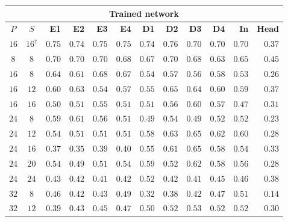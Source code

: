 \begin{table}[!tbp]
    \centering
    \color{red}\captionsetup{font+=probingred} %
    \small
    \setlength{\tabcolsep}{3.5pt}
    \begin{tabular}{@{}ccrrrrrrrrrr@{}}
        \toprule
        \multicolumn{12}{c}{\textbf{Trained network}} \\
        \midrule
        \textbf{$P$} & \textbf{$S$} & \textbf{E1} & \textbf{E2} & \textbf{E3} & \textbf{E4} & \textbf{D1} & \textbf{D2} & \textbf{D3} & \textbf{D4} & \textbf{In} & \textbf{Head} \\
        \midrule
        $16$ & $16^{\dagger}$ & $0.75$ & $0.74$ & $0.75$ & $0.75$ & $0.74$ & $0.76$ & $0.70$ & $0.70$ & $0.70$ & $0.37$ \\
        \midrule
        \addlinespace[2pt]
        $8$ & $8$ & $0.70$ & $0.70$ & $0.70$ & $0.68$ & $0.67$ & $0.70$ & $0.68$ & $0.63$ & $0.65$ & $0.45$ \\
        \addlinespace[2pt]
        $16$ & $8$ & $0.64$ & $0.61$ & $0.68$ & $0.67$ & $0.54$ & $0.57$ & $0.56$ & $0.58$ & $0.53$ & $0.26$ \\
        $16$ & $12$ & $0.60$ & $0.63$ & $0.54$ & $0.57$ & $0.55$ & $0.65$ & $0.64$ & $0.60$ & $0.59$ & $0.37$ \\
        $16$ & $16$ & $0.50$ & $0.51$ & $0.55$ & $0.51$ & $0.51$ & $0.56$ & $0.60$ & $0.57$ & $0.47$ & $0.31$ \\
        \addlinespace[2pt]
        $24$ & $8$ & $0.59$ & $0.61$ & $0.56$ & $0.51$ & $0.49$ & $0.54$ & $0.49$ & $0.52$ & $0.52$ & $0.23$ \\
        $24$ & $12$ & $0.54$ & $0.51$ & $0.51$ & $0.51$ & $0.58$ & $0.63$ & $0.65$ & $0.62$ & $0.60$ & $0.28$ \\
        $24$ & $16$ & $0.37$ & $0.35$ & $0.39$ & $0.40$ & $0.55$ & $0.61$ & $0.65$ & $0.58$ & $0.54$ & $0.33$ \\
        $24$ & $20$ & $0.54$ & $0.49$ & $0.51$ & $0.54$ & $0.59$ & $0.52$ & $0.62$ & $0.58$ & $0.56$ & $0.28$ \\
        $24$ & $24$ & $0.43$ & $0.42$ & $0.41$ & $0.42$ & $0.52$ & $0.42$ & $0.41$ & $0.45$ & $0.46$ & $0.38$ \\
        \addlinespace[2pt]
        $32$ & $8$ & $0.46$ & $0.42$ & $0.43$ & $0.49$ & $0.32$ & $0.38$ & $0.42$ & $0.47$ & $0.51$ & $0.14$ \\
        $32$ & $12$ & $0.39$ & $0.43$ & $0.45$ & $0.47$ & $0.50$ & $0.52$ & $0.53$ & $0.52$ & $0.52$ & $0.30$ \\

\end{tabular}
\end{table}
